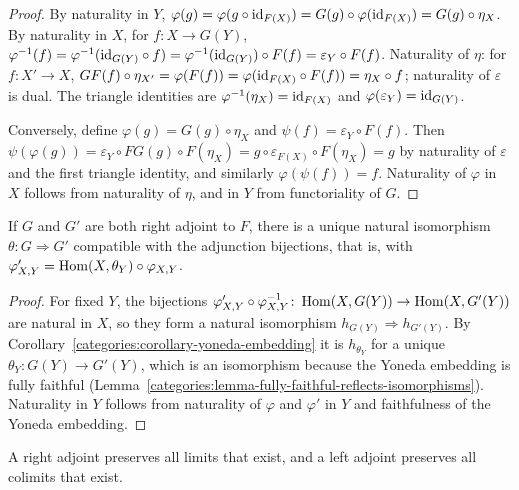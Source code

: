 \begin{proof}
By naturality in $Y$, $\varphi(g) = \varphi(g \circ \mathrm{id}_{F(X)}) = G(g) \circ \varphi(\mathrm{id}_{F(X)}) = G(g) \circ \eta_X$.
By naturality in $X$, for $f \colon X \to G(Y)$,
$\varphi^{-1}(f) = \varphi^{-1}(\mathrm{id}_{G(Y)} \circ f) = \varphi^{-1}(\mathrm{id}_{G(Y)}) \circ F(f) = \varepsilon_Y \circ F(f)$.
Naturality of $\eta$: for $f \colon X' \to X$,
$GF(f) \circ \eta_{X'} = \varphi(F(f)) = \varphi(\mathrm{id}_{F(X)} \circ F(f)) = \eta_X \circ f$;
naturality of $\varepsilon$ is dual. The triangle identities are
$\varphi^{-1}(\eta_X) = \mathrm{id}_{F(X)}$ and $\varphi(\varepsilon_Y) = \mathrm{id}_{G(Y)}$.

Conversely, define $\varphi(g) = G(g) \circ \eta_X$ and $\psi(f) = \varepsilon_Y \circ F(f)$.
Then $\psi(\varphi(g)) = \varepsilon_Y \circ FG(g) \circ F(\eta_X) = g \circ \varepsilon_{F(X)} \circ F(\eta_X) = g$
by naturality of $\varepsilon$ and the first triangle identity, and similarly
$\varphi(\psi(f)) = f$. Naturality of $\varphi$ in $X$ follows from naturality of
$\eta$, and in $Y$ from functoriality of $G$.
\end{proof}

\begin{proposition}\label{categories:proposition-adjoint-unique}
If $G$ and $G'$ are both right adjoint to $F$, there is a unique natural
isomorphism $\theta \colon G \Rightarrow G'$ compatible with the adjunction bijections,
that is, with $\varphi'_{X,Y} = \operatorname{Hom}(X, \theta_Y) \circ \varphi_{X,Y}$.
\end{proposition}

\begin{proof}
For fixed $Y$, the bijections $\varphi'_{X,Y} \circ \varphi_{X,Y}^{-1} \colon
\operatorname{Hom}(X, G(Y)) \to \operatorname{Hom}(X, G'(Y))$ are natural in $X$, so they form a natural
isomorphism $h_{G(Y)} \Rightarrow h_{G'(Y)}$. By
Corollary~\ref{categories:corollary-yoneda-embedding} it is $h_{\theta_Y}$ for a
unique $\theta_Y \colon G(Y) \to G'(Y)$, which is an isomorphism because the Yoneda
embedding is fully faithful
(Lemma~\ref{categories:lemma-fully-faithful-reflects-isomorphisms}). Naturality in
$Y$ follows from naturality of $\varphi$ and $\varphi'$ in $Y$ and faithfulness of the
Yoneda embedding.
\end{proof}

\begin{theorem}\label{categories:theorem-adjoints-preserve-limits}
A right adjoint preserves all limits that exist, and a left adjoint preserves
all colimits that exist.
\end{theorem}

